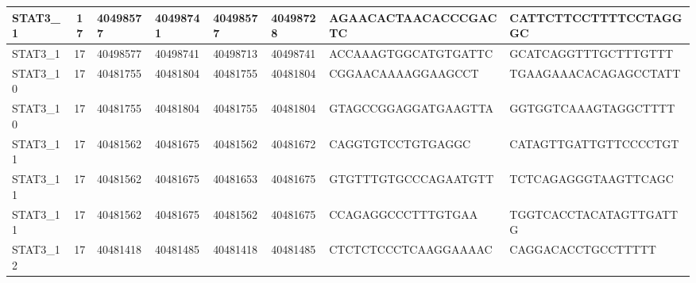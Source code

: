 \begin{landscape}
\begin{longtable}{| p{} | p{} | p{} | p{} | p{} | p{} | p{} | p{} |}
\multicolumn{1}{|l|}{STAT3\_1}   & \multicolumn{1}{c|}{17} & \multicolumn{1}{l|}{40498577}  & \multicolumn{1}{l|}{40498741}  & \multicolumn{1}{l|}{40498577}  & \multicolumn{1}{l|}{40498728}  & \multicolumn{1}{l|}{AGAACACTAACACCCGACTC}            & \multicolumn{1}{l|}{CATTCTTCCTTTTCCTAGGGC}         \\ \hline
\multicolumn{1}{|l|}{STAT3\_1}   & \multicolumn{1}{c|}{17} & \multicolumn{1}{l|}{40498577}  & \multicolumn{1}{l|}{40498741}  & \multicolumn{1}{l|}{40498713}  & \multicolumn{1}{l|}{40498741}  & \multicolumn{1}{l|}{ACCAAAGTGGCATGTGATTC}            & \multicolumn{1}{l|}{GCATCAGGTTTGCTTTGTTT}          \\ \hline
\multicolumn{1}{|l|}{STAT3\_10}  & \multicolumn{1}{c|}{17} & \multicolumn{1}{l|}{40481755}  & \multicolumn{1}{l|}{40481804}  & \multicolumn{1}{l|}{40481755}  & \multicolumn{1}{l|}{40481804}  & \multicolumn{1}{l|}{CGGAACAAAAGGAAGCCT}              & \multicolumn{1}{l|}{TGAAGAAACACAGAGCCTATT}         \\ \hline
\multicolumn{1}{|l|}{STAT3\_10}  & \multicolumn{1}{c|}{17} & \multicolumn{1}{l|}{40481755}  & \multicolumn{1}{l|}{40481804}  & \multicolumn{1}{l|}{40481755}  & \multicolumn{1}{l|}{40481804}  & \multicolumn{1}{l|}{GTAGCCGGAGGATGAAGTTA}            & \multicolumn{1}{l|}{GGTGGTCAAAGTAGGCTTTT}          \\ \hline
\multicolumn{1}{|l|}{STAT3\_11}  & \multicolumn{1}{c|}{17} & \multicolumn{1}{l|}{40481562}  & \multicolumn{1}{l|}{40481675}  & \multicolumn{1}{l|}{40481562}  & \multicolumn{1}{l|}{40481672}  & \multicolumn{1}{l|}{CAGGTGTCCTGTGAGGC}               & \multicolumn{1}{l|}{CATAGTTGATTGTTCCCCTGT}         \\ \hline
\multicolumn{1}{|l|}{STAT3\_11}  & \multicolumn{1}{c|}{17} & \multicolumn{1}{l|}{40481562}  & \multicolumn{1}{l|}{40481675}  & \multicolumn{1}{l|}{40481653}  & \multicolumn{1}{l|}{40481675}  & \multicolumn{1}{l|}{GTGTTTGTGCCCAGAATGTT}            & \multicolumn{1}{l|}{TCTCAGAGGGTAAGTTCAGC}          \\ \hline
\multicolumn{1}{|l|}{STAT3\_11}  & \multicolumn{1}{c|}{17} & \multicolumn{1}{l|}{40481562}  & \multicolumn{1}{l|}{40481675}  & \multicolumn{1}{l|}{40481562}  & \multicolumn{1}{l|}{40481675}  & \multicolumn{1}{l|}{CCAGAGGCCCTTTGTGAA}              & \multicolumn{1}{l|}{TGGTCACCTACATAGTTGATTG}        \\ \hline
\multicolumn{1}{|l|}{STAT3\_12}  & \multicolumn{1}{c|}{17} & \multicolumn{1}{l|}{40481418}  & \multicolumn{1}{l|}{40481485}  & \multicolumn{1}{l|}{40481418}  & \multicolumn{1}{l|}{40481485}  & \multicolumn{1}{l|}{CTCTCTCCCTCAAGGAAAAC}            & \multicolumn{1}{l|}{CAGGACACCTGCCTTTTT}            \\ \hline

\end{longtable}
\end{landscape}

